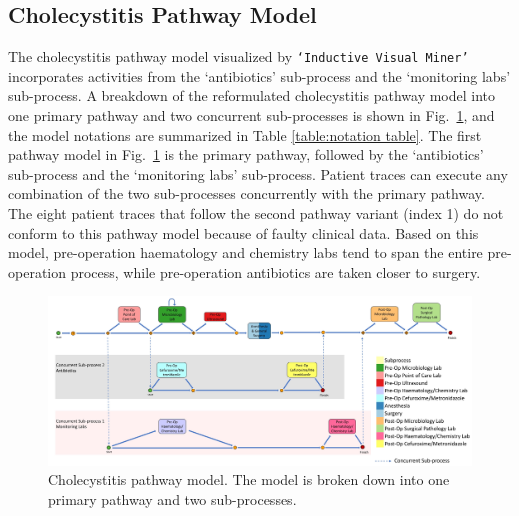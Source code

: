 \documentclass{elsarticle}
\begin{document}
\subsection{Cholecystitis Pathway Model}
The cholecystitis pathway model visualized by \texttt{`Inductive Visual Miner'} incorporates activities from the `antibiotics' sub-process and the `monitoring labs' sub-process. A breakdown of the reformulated cholecystitis pathway model into one primary pathway and two concurrent sub-processes is shown in Fig.~\ref{fig:cholecystitis pathway model}, and the model notations are summarized in Table \ref{table:notation table}. The first pathway model in Fig.~\ref{fig:cholecystitis pathway model} is the primary pathway, followed by the `antibiotics’ sub-process and the `monitoring labs’ sub-process. Patient traces can execute any combination of the two sub-processes concurrently with the primary pathway. The eight patient traces that follow the second pathway variant (index 1) do not conform to this pathway model because of faulty clinical data. Based on this model, pre-operation haematology and chemistry labs tend to span the entire pre-operation process, while pre-operation antibiotics are taken closer to surgery.

\begin{figure}[t]
\centering
\includegraphics[width=18cm,angle=270]{images/communicative_cholecystitis_process_models_anes.jpg}
\caption{Cholecystitis pathway model. The model is broken down into one primary pathway and two sub-processes.}
\label{fig:cholecystitis pathway model}
\end{figure}
\end{document}

